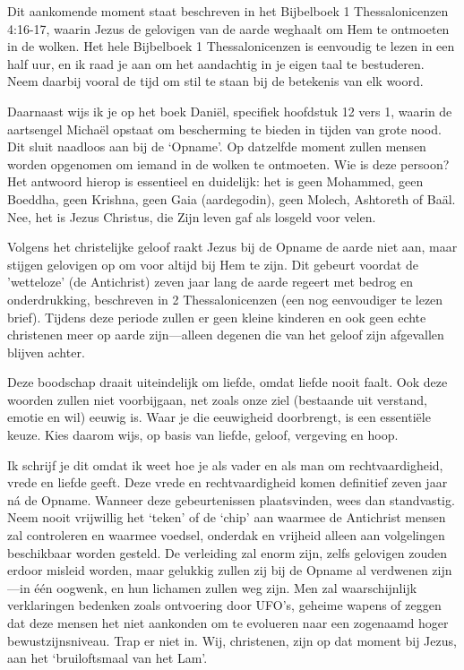 Dit aankomende moment staat beschreven in het Bijbelboek 1 Thessalonicenzen 4:16-17, waarin Jezus de gelovigen van de aarde weghaalt om Hem te ontmoeten in de wolken. Het hele Bijbelboek 1 Thessalonicenzen is eenvoudig te lezen in een half uur, en ik raad je aan om het aandachtig in je eigen taal te bestuderen. Neem daarbij vooral de tijd om stil te staan bij de betekenis van elk woord.

Daarnaast wijs ik je op het boek Daniël, specifiek hoofdstuk 12 vers 1, waarin de aartsengel Michaël opstaat om bescherming te bieden in tijden van grote nood. Dit sluit naadloos aan bij de ‘Opname’. Op datzelfde moment zullen mensen worden opgenomen om iemand in de wolken te ontmoeten. Wie is deze persoon? Het antwoord hierop is essentieel en duidelijk: het is geen Mohammed, geen Boeddha, geen Krishna, geen Gaia (aardegodin), geen Molech, Ashtoreth of Baäl. Nee, het is Jezus Christus, die Zijn leven gaf als losgeld voor velen.

Volgens het christelijke geloof raakt Jezus bij de Opname de aarde niet aan, maar stijgen gelovigen op om voor altijd bij Hem te zijn. Dit gebeurt voordat de 'wetteloze' (de Antichrist) zeven jaar lang de aarde regeert met bedrog en onderdrukking, beschreven in 2 Thessalonicenzen (een nog eenvoudiger te lezen brief). Tijdens deze periode zullen er geen kleine kinderen en ook geen echte christenen meer op aarde zijn—alleen degenen die van het geloof zijn afgevallen blijven achter.

Deze boodschap draait uiteindelijk om liefde, omdat liefde nooit faalt. Ook deze woorden zullen niet voorbijgaan, net zoals onze ziel (bestaande uit verstand, emotie en wil) eeuwig is. Waar je die eeuwigheid doorbrengt, is een essentiële keuze. Kies daarom wijs, op basis van liefde, geloof, vergeving en hoop.

Ik schrijf je dit omdat ik weet hoe je als vader en als man om rechtvaardigheid, vrede en liefde geeft. Deze vrede en rechtvaardigheid komen definitief zeven jaar ná de Opname. Wanneer deze gebeurtenissen plaatsvinden, wees dan standvastig. Neem nooit vrijwillig het ‘teken’ of de ‘chip’ aan waarmee de Antichrist mensen zal controleren en waarmee voedsel, onderdak en vrijheid alleen aan volgelingen beschikbaar worden gesteld. De verleiding zal enorm zijn, zelfs gelovigen zouden erdoor misleid worden, maar gelukkig zullen zij bij de Opname al verdwenen zijn—in één oogwenk, en hun lichamen zullen weg zijn. Men zal waarschijnlijk verklaringen bedenken zoals ontvoering door UFO’s, geheime wapens of zeggen dat deze mensen het niet aankonden om te evolueren naar een zogenaamd hoger bewustzijnsniveau. Trap er niet in. Wij, christenen, zijn op dat moment bij Jezus, aan het ‘bruiloftsmaal van het Lam’.

